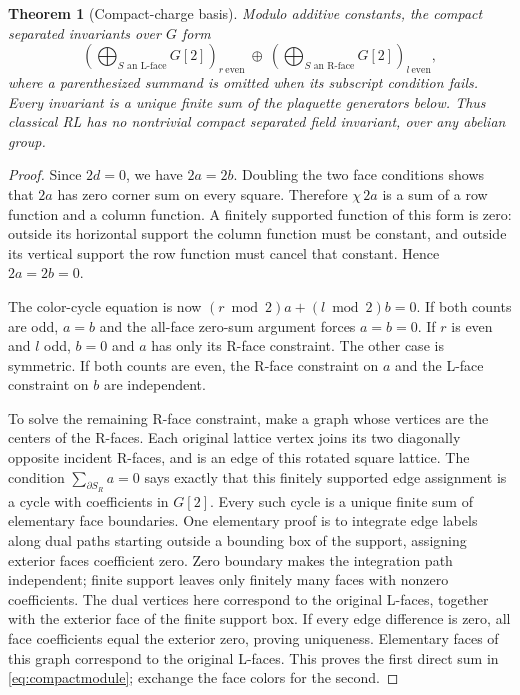 \documentclass[11pt]{article}
\newtheorem{theorem}{Theorem}[section]
\theoremstyle{definition}
\begin{document}
\begin{theorem}[Compact-charge basis]\label{thm:compact}
Modulo additive constants, the compact separated invariants over $G$ form
\begin{equation}\label{eq:compactmodule}
 \left(\bigoplus_{S\text{ an L-face}}G[2]\right)_{r\ \mathrm{even}}
 \ \oplus\
 \left(\bigoplus_{S\text{ an R-face}}G[2]\right)_{l\ \mathrm{even}},
\end{equation}
where a parenthesized summand is omitted when its subscript condition fails.
Every invariant is a unique finite sum of the plaquette generators below.
Thus classical RL has no nontrivial compact separated field invariant, over
any abelian group.
\end{theorem}
\begin{proof}
Since $2d=0$, we have $2a=2b$. Doubling the two face conditions shows that $2a$
has zero corner sum on every square. Therefore $\chi\,2a$ is a sum of a row
function and a column function. A finitely supported function of this form is
zero: outside its horizontal support the column function must be constant,
and outside its vertical support the row function must cancel that constant.
Hence $2a=2b=0$.

The color-cycle equation is now
$(r\bmod2)a+(l\bmod2)b=0$. If both counts are odd, $a=b$ and the all-face
zero-sum argument forces $a=b=0$. If $r$ is even and $l$ odd, $b=0$ and $a$
has only its R-face constraint. The other case is symmetric. If both counts
are even, the R-face constraint on $a$ and the L-face constraint on $b$ are
independent.

To solve the remaining R-face constraint, make a graph whose vertices are the
centers of the R-faces. Each original lattice vertex joins its two diagonally
opposite incident R-faces, and is an edge of this rotated square lattice. The
condition $\sum_{\partial S_R}a=0$ says exactly that this finitely supported
edge assignment is a cycle with coefficients in $G[2]$. Every such cycle is a
unique finite sum of elementary face boundaries. One elementary proof is to
integrate edge labels along dual paths starting outside a bounding box of
the support, assigning exterior faces coefficient zero. Zero boundary makes
the integration path independent; finite support leaves only finitely many
faces with nonzero coefficients. The dual vertices here correspond to the
original L-faces, together with the exterior face of the finite support box.
If every edge difference is zero, all face coefficients equal the exterior
zero, proving uniqueness. Elementary faces of this graph correspond to the
original L-faces. This proves the first direct sum in
\eqref{eq:compactmodule}; exchange the face colors for the second.


\end{proof}
\end{document}
